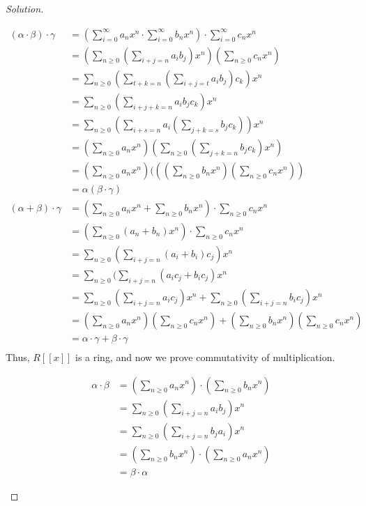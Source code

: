 \documentclass[10pt]{article}
\theoremstyle{definition}
\theoremstyle{remark}
\newenvironment{solution}
  {\renewcommand\qedsymbol{$\blacksquare$}\begin{proof}[Solution]}
  {\end{proof}}
\begin{document}
\begin{solution}
\begin{enumerate}[a)]
    \begin{align*}
        (\alpha \cdot \beta) \cdot \gamma &= (\sum_{i=0}^\infty a_nx^n \cdot \sum_{i=0}^\infty b_nx^n) \cdot \sum_{i=0}^\infty c_nx^n \\
                                          &=  (\sum_{n \geq 0}(\sum_{i+j = n}a_ib_j)x^n)(\sum_{n \geq 0} c_nx^n)\\
                                          &= \sum_{n \geq 0}(\sum_{t+k = n}(\sum_{i+j=t} a_ib_j)c_k)x^n \\
                                          &= \sum_{n \geq 0}(\sum_{i+j+k = n}a_ib_jc_k)x^n \\
                                          &= \sum_{n \geq 0}(\sum_{i+s=n}a_i(\sum_{j+k=s}b_jc_k))x^n \\
                                          &= (\sum_{n \geq 0} a_nx^n)(\sum_{n \geq 0}(\sum_{j+k=n}b_jc_k)x^n) \\
                                          &= (\sum_{n \geq 0} a_nx^n)(((\sum_{n \geq 0} b_nx^n)(\sum_{n \geq 0} c_nx^n)) \\
                                          &= \alpha ( \beta \cdot \gamma) \\
        (\alpha + \beta) \cdot \gamma &= (\sum_{n \geq 0} a_nx^n + \sum_{n \geq 0} b_nx^n) \cdot \sum_{n \geq 0} c_nx^n \\
                                      &= (\sum_{n \geq 0} (a_n+b_n)x^n) \cdot \sum_{n \geq 0} c_nx^n \\
                                      &= \sum_{n \geq 0} (\sum_{i+j=n} (a_i+b_i)c_j) x^n \\
                                      &= \sum_{n \geq 0} (\sum_{i+j=n} (a_ic_j + b_ic_j) x^n \\
                                      &= \sum_{n \geq 0} (\sum_{i+j=n} a_ic_j) x^n + \sum_{n \geq 0} (\sum_{i+j=n} b_ic_j) x^n\\
                                      &= (\sum_{n \geq 0} a_nx^n)(\sum_{n \geq 0} c_nx^n) + (\sum_{n \geq 0} b_nx^n)(\sum_{n \geq 0} c_nx^n) \\
                                      &= \alpha \cdot \gamma + \beta \cdot \gamma \\
    \end{align*}
    Thus, $R[[x]]$ is a ring, and now we prove commutativity of multiplication.
    
    \begin{align*}
        \alpha \cdot \beta &= (\sum_{n \geq 0} a_nx^n) \cdot (\sum_{n \geq 0} b_nx^n) \\
                           &= \sum_{n \geq 0}(\sum_{i+j = n} a_ib_j) x^n \\
                           &= \sum_{n \geq 0}(\sum_{i+j = n} b_ja_i) x^n \\
                           &= (\sum_{n \geq 0} b_nx^n) \cdot (\sum_{n \geq 0} a_nx^n) \\
                           &= \beta \cdot \alpha
    \end{align*}
    

\end{enumerate}
\end{solution}
\end{document}
